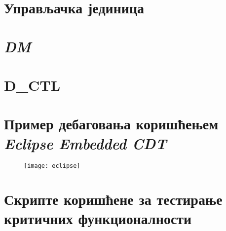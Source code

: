 \begin{appendices}

\lstset{numbers=left, numberstyle=\tiny, stepnumber=1, numbersep=5pt}

\chapter{Управљачка јединица}\label{sec.control}


\chapter{\textit{\acrfull{DM}}}\label{sec.dm}


\chapter{\textbf{D\_CTL}}\label{sec.dctl}


\chapter{Пример дебаговања коришћењем \textit{Eclipse Embedded CDT}}\label{sec.eclipse}
\begin{figure}[h!]
	\centering
	\texttt{[image: eclipse]}
\end{figure}

\chapter{Скрипте коришћене за тестирање критичних функционалности}\label{chap:scr}






\newpage
\newpage



\end{appendices}

